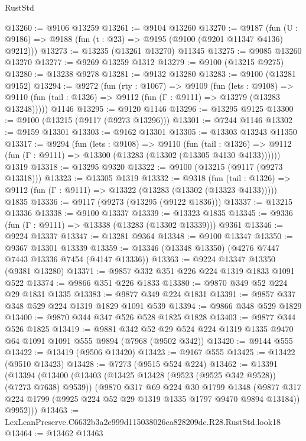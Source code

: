 \begin{lexlean}{RustStd}
\begin{coremodule}
@13260 := @9106 @13259
@13261 := @9104 @13260
@13270 := @9187
    (fun (U : @9186) => @9188 (fun (t : @23) => @9195 (@9100 (@9201 @11347 @4136) @9212)))
@13273 := @13235 (@13261 @13270) @11345
@13275 := @9085 @13260 @13270
@13277 := @9269 @13259 @1312
@13279 := @9100 (@13215 @9275)
@13280 := @13238 @9278
@13281 := @9132 @13280
@13283 := @9100 (@13281 @9152)
@13294 := @9272
    (fun (rty : @1067) =>
    @9109
      (fun (lets : @9108) =>
      @9110 (fun (tail : @1326) => @9112 (fun (Γ : @9111) => @13279 (@13283 @13248)))))
    @1146
@13295 := @9120 @1146
@13296 := @13295 @9125
@13300 := @9100 (@13215 (@9117 (@9273 @13296)))
@13301 := @7244 @1146
@13302 := @9159 @13301
@13303 := @9162 @13301
@13305 := @13303 @13243 @11350
@13317 := @9294
    (fun (lets : @9108) =>
    @9110
      (fun (tail : @1326) =>
      @9112 (fun (Γ : @9111) => @13300 (@13283 (@13302 (@13305 @4130 @4133))))))
    @1319
@13318 := @13295 @9320
@13322 := @9100 (@13215 (@9117 (@9273 @13318)))
@13323 := @13305 @1319
@13332 := @9318
    (fun (tail : @1326) => @9112 (fun (Γ : @9111) => @13322 (@13283 (@13302 (@13323 @4133)))))
    @1835
@13336 := @9117 (@9273 (@13295 (@9122 @1836)))
@13337 := @13215 @13336
@13338 := @9100 @13337
@13339 := @13323 @1835
@13345 := @9336 (fun (Γ : @9111) => @13338 (@13283 (@13302 @13339))) @9361
@13346 := @9224 @13337
@13347 := @13281 @9364
@13348 := @9100 @13347
@13350 := @9367 @13301 @13339
@13359 := @13346 (@13348 @13350) (@4276 @7447 @7443 @13336 @7454 (@4147 @13336))
@13363 := @9224 @13347 @13350 (@9381 @13280)
@13371 := @9857 @332 @351 @226 @224 @1319 @1833 @1091 @522
@13374 := @9866 @351 @226 @1833
@13380 := @9870 @349 @52 @224 @29 @1831 @1335
@13383 := @9877 @349 @224 @1831
@13391 := @9857 @337 @348 @529 @224 @1319 @1829 @1091 @539
@13394 := @9866 @348 @529 @1829
@13400 := @9870 @344 @347 @526 @528 @1825 @1828
@13403 := @9877 @344 @526 @1825
@13419 := @9881
    @342
    @52
    @29
    @524
    @224
    @1319
    @1335
    @9470
    @64
    @1091
    @1091
    @555
    @9894
    (@7968 (@9502 @342))
@13420 := @9144 @555
@13422 := @13419 (@9506 @13420)
@13423 := @9167 @555
@13425 := @13422 (@9510 @13423)
@13428 := @7273 (@9515 @524 @224)
@13462 := @13391
    (@13394
      (@13400
        (@13403 (@13425 @13428 (@9523 (@9525 @342 @9528)) (@7273 @7638) @9539))
        (@9870
          @317
          @69
          @224
          @30
          @1799
          @1348
          (@9877 @317 @224 @1799 (@9925 @224 @52 @29 @1319 @1335 @1797 @9470 @9894 @13184))
          @9952)))
@13463 := LexLeanPreserve.C6632b3a2e999d115038026ca828209de.R28.RustStd.look18
@13464 := @13462 @13463

\end{coremodule}
\end{lexlean}
